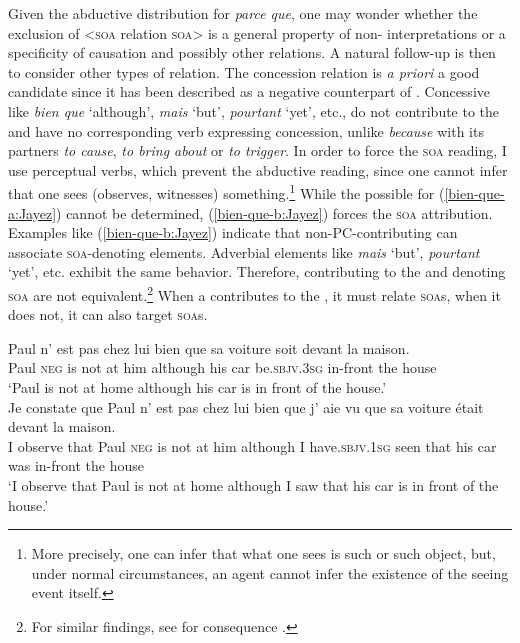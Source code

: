 \documentclass[output=paper,colorlinks,citecolor=brown]{langscibook}
\begin{document}
Given the abductive distribution for \textit{parce que}, one may wonder whether the exclusion of <\textsc{soa} relation \textsc{soa}> is a general property of non- interpretations or a specificity of causation and possibly other relations. A natural follow-up is then to consider other types of relation. The concession relation is \textit{a priori} a good candidate since it has been described as a negative counterpart of  \citep{Verhagen:2005}. Concessive  like \textit{bien que} `although', \textit{mais} `but', \textit{pourtant} `yet', etc., do not contribute to the  and have no corresponding verb expressing concession, unlike \textit{because} with its partners \textit{to cause}, \textit{to bring about} or \textit{to trigger}. In order to force the \textsc{soa} reading, I use perceptual verbs, which prevent the abductive reading, since one cannot infer that one sees (observes, witnesses) something.\footnote{More precisely, one can infer that what one sees is such or such object, but, under normal circumstances, an agent cannot infer the existence of the seeing event itself.} While the possible  for (\ref{bien-que-a:Jayez}) cannot be determined, (\ref{bien-que-b:Jayez}) forces the \textsc{soa} attribution. Examples like (\ref{bien-que-b:Jayez}) indicate that non-PC-contributing  can associate \textsc{soa}-denoting elements. Adverbial elements like \textit{mais} `but', \textit{pourtant} `yet', etc. exhibit the same behavior. Therefore, contributing to the  and denoting \textsc{soa} are not equivalent.\footnote{For similar findings, see \citet{JayezandRossari:2001} for consequence .} When a  contributes to the , it must relate \textsc{soa}s, when it does not, it can also target \textsc{soa}s.

\ea
\label{bien-que:Jayez}
\ea \label{bien-que-a:Jayez}
\gll Paul n' est pas chez lui {bien que} sa voiture soit devant la maison.\\
Paul \textsc{neg} is not at him although his car be.\textsc{sbjv.3sg} {in-front} the house\\
\glt `Paul {is not} at home although his car is in front of the house.'\\
\ex \label{bien-que-b:Jayez}
\gll Je constate que Paul n' est pas chez lui {bien que} j' aie vu que sa voiture était devant la maison.\\
I observe that Paul \textsc{neg} is not at him although I have.\textsc{sbjv.1sg} seen that his car was {in-front} the house\\
\glt `I observe that Paul is not at home although I saw that his car is in front of the house.'
\z
\z
\end{document}
